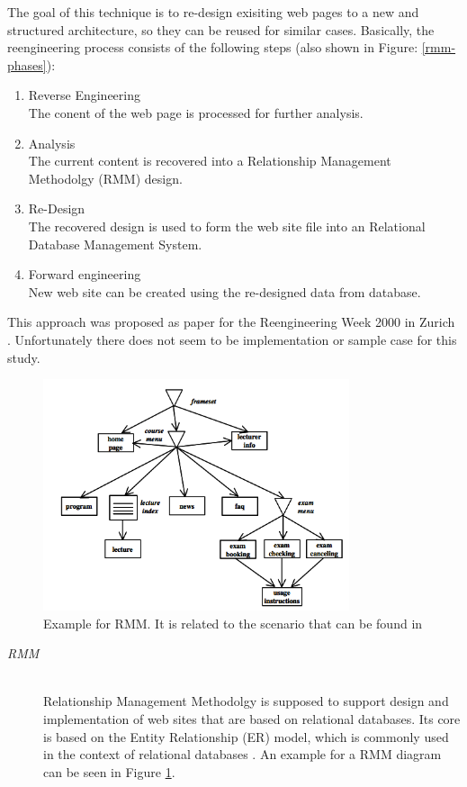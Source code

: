\begin{enumerate}[A.]
	The goal of this technique is to re-design exisiting web pages to a new and structured architecture, so they can be reused for similar cases. Basically, the reengineering process consists of the following steps (also shown in Figure: \ref{rmm-phases}):
	
	\begin{enumerate}
		\item Reverse Engineering\\
			The conent of the web page is processed for further analysis.
		\item Analysis\\ 
			The current content is recovered into a Relationship Management Methodolgy (RMM) design.
		\item Re-Design\\
			The recovered design is used to form the web site file into an Relational Database Management System.
		\item Forward engineering\\
			New web site can be created using the re-designed data from database.
	\end{enumerate}
	
	This approach was proposed as paper for the Reengineering Week 2000 in Zurich \cite{antoniol2000web}. Unfortunately there does
 not
 seem to be implementation or sample case for this study. 

	\begin{figure}\centering
			\includegraphics[width=9cm]{images/rmm-example.png}
			\caption{Example for RMM. It is related to the scenario that can be found in \cite{antoniol2000web}}
			\label{rmm-example}
	\end{figure} 
	\begin{description}
	
		\item[\emph{RMM}]\mbox{}\\
		Relationship Management Methodolgy is supposed to support design and implementation of web sites that are based on relational databases. Its core is based on the Entity Relationship (ER) model, which is commonly used in the context of relational databases \cite{batini1992conceptual}. An example for a RMM diagram can be seen in Figure \ref{rmm-example}. 
		

\end{description}
\end{enumerate}
